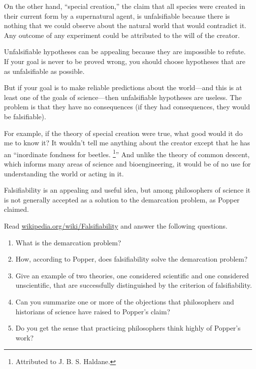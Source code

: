 \documentclass[10pt]{book}
\begin{document}
On the other hand, ``special creation,'' the claim that all species
were created in their current form by a supernatural agent, is
unfalsifiable because there is nothing that we could observe about the
natural world that would contradict it.  Any outcome of any experiment
could be attributed to the will of the creator.  

Unfalsifiable hypotheses can be appealing because
they are impossible to refute.  If your goal is never to be
proved wrong, you should choose hypotheses that are as
unfalsifiable as possible.

But if your goal is to make reliable predictions about the world---and
this is at least one of the goals of science---then unfalsifiable
hypotheses are useless.  The problem is that they have
no consequences (if they had consequences, they would be
falsifiable).

For example, if the theory of special creation were true, what good
would it do me to know it?  It wouldn't tell me anything about the
creator except that he has an ``inordinate fondness for beetles.
\footnote{Attributed to J. B. S. Haldane.}''  And unlike the
theory of common descent, which informs many areas of science
and bioengineering, it would be of no use for understanding
the world or acting in it.

\begin{ex}

Falsifiability is an appealing and useful idea, but among
philosophers of science it is not generally accepted 
as a solution to the demarcation problem, as Popper claimed.

Read \url{wikipedia.org/wiki/Falsifiability} and answer the following
questions.

\begin{enumerate}

\item What is the demarcation problem?

\item How, according to Popper, does falsifiability solve the
demarcation problem?

\item Give an example of two theories, one considered scientific
and one considered unscientific, that are successfully distinguished
by the criterion of falsifiability.

\item Can you summarize one or more of the objections that 
philosophers and historians of science have raised to Popper's
claim?

\item Do you get the sense that practicing philosophers think
highly of Popper's work?

\end{enumerate}

\end{ex}
\end{document}
